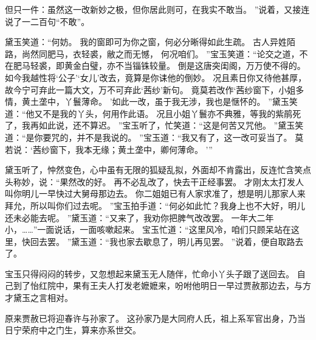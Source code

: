但只一件：虽然这一改新妙之极，但你居此则可，在我实不敢当。
”说着，又接连说了一二百句“不敢”。
\par
黛玉笑道：“何妨。
我的窗即可为你之窗，何必分晰得如此生疏。
古人异姓陌路，尚然同肥马，衣轻裘，敝之而无憾，
何况咱们。
”宝玉笑道：“论交之道，不在肥马轻裘，即黄金白璧，亦不当锱铢较量。
倒是这唐突闺阁，万万使不得的。
如今我越性将‘公子’‘女儿’改去，竟算是你诔他的倒妙。
况且素日你又待他甚厚，故今宁可弃此一篇大文，万不可弃此‘茜纱’新句。
竟莫若改作‘茜纱窗下，小姐多情，黄土垄中，丫鬟薄命。
’如此一改，虽于我无涉，我也是惬怀的。
”黛玉笑道：“他又不是我的丫头，何用作此语。
况且小姐丫鬟亦不典雅，等我的紫鹃死了，我再如此说，还不算迟。
”宝玉听了，忙笑道：“这是何苦又咒他。
”黛玉笑道：“是你要咒的，并不是我说的。
”宝玉道：“我又有了，这一改可妥当了。
莫若说：‘茜纱窗下，我本无缘；黄土垄中，卿何薄命。
’”\par
黛玉听了，忡然变色，心中虽有无限的狐疑乱拟，外面却不肯露出，反连忙含笑点头称妙，说：“果然改的好。
再不必乱改了，快去干正经事罢。
才刚太太打发人叫你明儿一早快过大舅母那边去。
你二姐姐已有人家求准了，想是明儿那家人来拜允，所以叫你们过去呢。
”宝玉拍手道：“何必如此忙？我身上也不大好，明儿还未必能去呢。
”黛玉道：“又来了，我劝你把脾气改改罢。
一年大二年小，……”一面说话，一面咳嗽起来。
宝玉忙道：“这里风冷，咱们只顾呆站在这里，快回去罢。
”黛玉道：“我也家去歇息了，明儿再见罢。
”说着，便自取路去了。
\par
宝玉只得闷闷的转步，又忽想起来黛玉无人随伴，忙命小丫头子跟了送回去。
自己到了怡红院中，果有王夫人打发老嬷嬷来，吩咐他明日一早过贾赦那边去，与方才黛玉之言相对。
\par
原来贾赦已将迎春许与孙家了。
这孙家乃是大同府人氏，祖上系军官出身，乃当日宁荣府中之门生，算来亦系世交。
